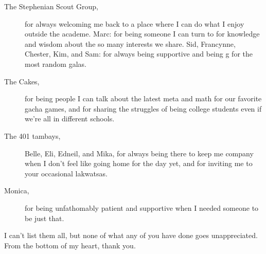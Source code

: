 \begin{description}
    \item[The Stephenian Scout Group,] for always welcoming me back to a place where I can do what I enjoy outside the academe. Marc: for being someone I can turn to for knowledge and wisdom about the so many interests we share. Sid, Francynne, Chester, Kim, and Sam: for always being supportive and being g for the most random galas.
    \item[The Cakes,] for being people I can talk about the latest meta and math for our favorite gacha games, and for sharing the struggles of being college students even if we're all in different schools. 
    \item[The 401 tambays,] Belle, Eli, Edneil, and Mika, for always being there to keep me company when I don't feel like going home for the day yet, and for inviting me to your occasional lakwatsas.
    \item[Monica,] for being unfathomably patient and supportive when I needed someone to be just that.
\end{description}

I can't list them all, but none of what any of you have done goes unappreciated. From the bottom of my heart, thank you.
